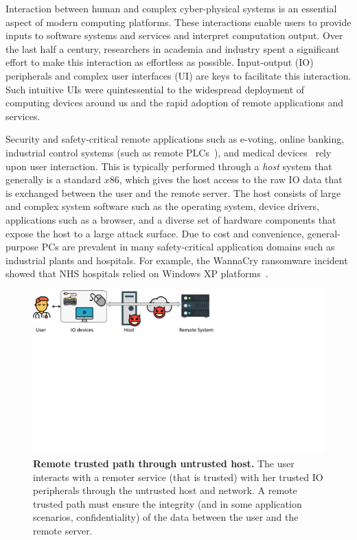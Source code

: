 Interaction between human and complex cyber-physical systems is an essential aspect of modern computing platforms. These interactions enable users to provide inputs to software systems and services and interpret computation output. Over the last half a century, researchers in academia and industry spent a significant effort to make this interaction as effortless as possible. Input-output (IO) peripherals and complex user interfaces (UI) are keys to facilitate this interaction. Such intuitive UIs were quintessential to the widespread deployment of computing devices around us and the rapid adoption of remote applications and services. 

Security and safety-critical remote applications such as e-voting, online banking, industrial control systems (such as remote PLCs~\cite{controlbyweb}), and medical devices~\cite{medicalDevice} rely upon user interaction. This is typically performed through a \emph{host} system that generally is a standard $x86$, which gives the host access to the raw IO data that is exchanged between the user and the remote server. The host consists of large and complex system software such as the operating system, device drivers, applications such as a browser, and a diverse set of hardware components that expose the host to a large attack surface. Due to cost and convenience, general-purpose PCs are prevalent in many safety-critical application domains such as industrial plants and hospitals. For example, the WannaCry ransomware incident showed that NHS hospitals relied on Windows XP platforms~\cite{berry_2017,field_wannacry_2018}. 


\begin{figure}[t]
  \centering
    \includegraphics[trim={0 14cm 12cm 0},clip,width=\linewidth]{chapters/introduction/images/trustedPath.pdf}
    \caption[Remote trusted path through untrusted host]{\textbf{Remote trusted path through untrusted host.} The user interacts with a remoter service (that is trusted) with her trusted IO peripherals through the untrusted host and network. A remote trusted path must ensure the integrity (and in some application scenarios, confidentiality) of the data between the user and the remote server.}
    \label{fig:trustedPath}
\end{figure}


